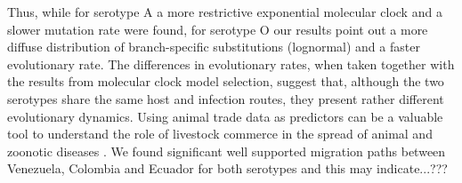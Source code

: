 \documentclass[10pt]{article}
\begin{document}
Thus, while for serotype A a more restrictive exponential molecular clock and a slower mutation rate were found, for serotype O our results point out a more diffuse distribution of branch-specific substitutions (lognormal) and a faster evolutionary rate.
The differences in evolutionary rates, when taken together with the results from molecular clock model selection, suggest that, although the two serotypes share the same host and infection routes, they present rather different evolutionary dynamics. 
Using animal trade data as predictors can be a valuable tool to understand the role of livestock commerce in the spread of animal and zoonotic diseases \cite{Nelson2011}.
We found significant well supported migration paths between Venezuela, Colombia and Ecuador for both serotypes and this may indicate...???
\end{document}

